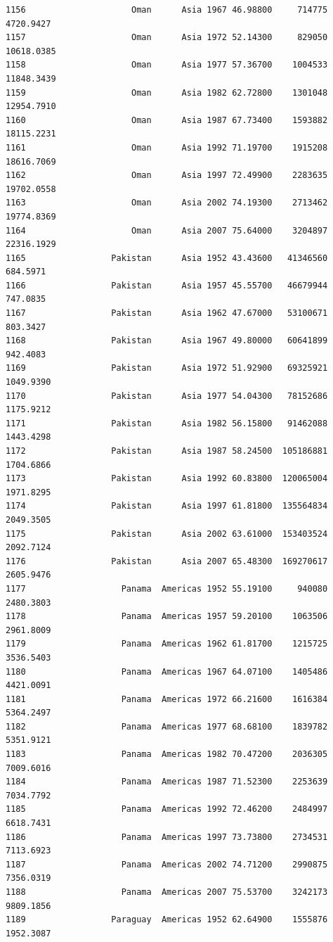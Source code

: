 \documentclass[
  letterpaper,
  DIV=11,
  numbers=noendperiod]{scrreprt}
\begin{document}
\begin{verbatim}
1156                     Oman      Asia 1967 46.98800     714775   4720.9427
1157                     Oman      Asia 1972 52.14300     829050  10618.0385
1158                     Oman      Asia 1977 57.36700    1004533  11848.3439
1159                     Oman      Asia 1982 62.72800    1301048  12954.7910
1160                     Oman      Asia 1987 67.73400    1593882  18115.2231
1161                     Oman      Asia 1992 71.19700    1915208  18616.7069
1162                     Oman      Asia 1997 72.49900    2283635  19702.0558
1163                     Oman      Asia 2002 74.19300    2713462  19774.8369
1164                     Oman      Asia 2007 75.64000    3204897  22316.1929
1165                 Pakistan      Asia 1952 43.43600   41346560    684.5971
1166                 Pakistan      Asia 1957 45.55700   46679944    747.0835
1167                 Pakistan      Asia 1962 47.67000   53100671    803.3427
1168                 Pakistan      Asia 1967 49.80000   60641899    942.4083
1169                 Pakistan      Asia 1972 51.92900   69325921   1049.9390
1170                 Pakistan      Asia 1977 54.04300   78152686   1175.9212
1171                 Pakistan      Asia 1982 56.15800   91462088   1443.4298
1172                 Pakistan      Asia 1987 58.24500  105186881   1704.6866
1173                 Pakistan      Asia 1992 60.83800  120065004   1971.8295
1174                 Pakistan      Asia 1997 61.81800  135564834   2049.3505
1175                 Pakistan      Asia 2002 63.61000  153403524   2092.7124
1176                 Pakistan      Asia 2007 65.48300  169270617   2605.9476
1177                   Panama  Americas 1952 55.19100     940080   2480.3803
1178                   Panama  Americas 1957 59.20100    1063506   2961.8009
1179                   Panama  Americas 1962 61.81700    1215725   3536.5403
1180                   Panama  Americas 1967 64.07100    1405486   4421.0091
1181                   Panama  Americas 1972 66.21600    1616384   5364.2497
1182                   Panama  Americas 1977 68.68100    1839782   5351.9121
1183                   Panama  Americas 1982 70.47200    2036305   7009.6016
1184                   Panama  Americas 1987 71.52300    2253639   7034.7792
1185                   Panama  Americas 1992 72.46200    2484997   6618.7431
1186                   Panama  Americas 1997 73.73800    2734531   7113.6923
1187                   Panama  Americas 2002 74.71200    2990875   7356.0319
1188                   Panama  Americas 2007 75.53700    3242173   9809.1856
1189                 Paraguay  Americas 1952 62.64900    1555876   1952.3087

\end{verbatim}
\end{document}

